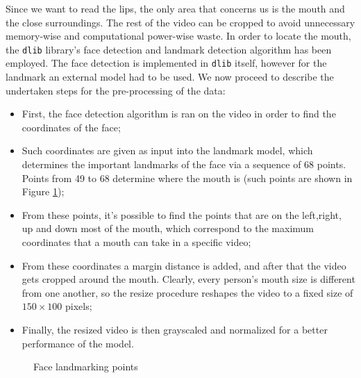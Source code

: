 \documentclass[11pt,journal]{IEEEtran}
\begin{document}
Since we want to read the lips, the only area that concerns us is the mouth and the close surroundings. The rest of the video can be cropped to avoid unnecessary memory-wise and computational power-wise waste. In order to locate the mouth, the \texttt{dlib} \cite{gunileo:dlib} library's face detection and landmark detection algorithm has been employed. The face detection is implemented in \texttt{dlib} itself, however for the landmark an external model had to be used. We now proceed to describe the undertaken steps for the pre-processing of the data:
\begin{itemize}
    \item [1)] First, the face detection algorithm is ran on the video in order to find the coordinates of the face;
    \item [2)] Such coordinates are given as input into the landmark model, which determines the important landmarks of the face via a sequence of 68 points. Points from 49 to 68 determine where the mouth is (such points are shown in Figure \ref{face_landmark_points});
    \item [3)] From these points, it's possible to find the points that are on the left,right, up and down most of the mouth, which correspond to the maximum coordinates that a mouth can take in a specific video;
    \item [4)] From these coordinates a margin distance is added, and after that the video gets cropped around the mouth. Clearly, every person's mouth size is different from one another, so the resize procedure reshapes the video to a fixed size of $150 \times 100$ pixels;
    \item [5)] Finally, the resized video is then grayscaled and normalized for a better performance of the model.
\end{itemize}

\begin{figure}
    \renewcommand{\arraystretch}{1.3}
    \caption{Face landmarking points}
    \label{face_landmark_points}
\end{figure}
\end{document}
